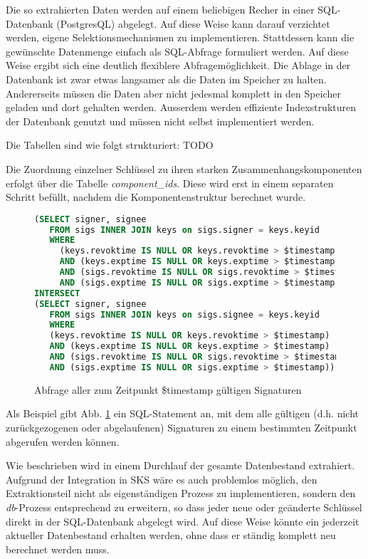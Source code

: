 Die so extrahierten Daten werden auf einem beliebigen Recher in einer
SQL-Datenbank (PostgresQL) abgelegt. Auf diese Weise kann darauf
verzichtet werden, eigene Selektionsmechanismen zu
implementieren. Stattdessen kann die gewünschte Datenmenge einfach als
SQL-Abfrage formuliert werden. Auf diese Weise ergibt sich eine
deutlich flexiblere Abfragemöglichkeit. Die Ablage in der Datenbank
ist zwar etwas langsamer als die Daten im Speicher zu
halten. Andererseits müssen die Daten aber nicht jedesmal komplett in
den Speicher geladen und dort gehalten werden. Ausserdem werden
effiziente Indexstrukturen der Datenbank genutzt und müssen nicht
selbst implementiert werden.

Die Tabellen sind wie folgt strukturiert: TODO

Die Zuordnung einzelner Schlüssel zu ihren starken
Zusammenhangskomponenten erfolgt über die Tabelle
\emph{component\_ids}. Diese wird erst in einem separaten Schritt
befüllt, nachdem die Komponentenstruktur berechnet wurde.

\begin{figure}[h]
\centering
{\scriptsize
\begin{lstlisting}[language=SQL]
(SELECT signer, signee
   FROM sigs INNER JOIN keys on sigs.signer = keys.keyid 
   WHERE 
     (keys.revoktime IS NULL OR keys.revoktime > $timestamp) 
     AND (keys.exptime IS NULL OR keys.exptime > $timestamp)
     AND (sigs.revoktime IS NULL OR sigs.revoktime > $timestamp) 
     AND (sigs.exptime IS NULL OR sigs.exptime > $timestamp)) 
INTERSECT 
(SELECT signer, signee 
   FROM sigs INNER JOIN keys on sigs.signee = keys.keyid
   WHERE 
   (keys.revoktime IS NULL OR keys.revoktime > $timestamp) 
   AND (keys.exptime IS NULL OR keys.exptime > $timestamp) 
   AND (sigs.revoktime IS NULL OR sigs.revoktime > $timestamp) 
   AND (sigs.exptime IS NULL OR sigs.exptime > $timestamp))"
\end{lstlisting}
}
\caption{Abfrage aller zum Zeitpunkt \$timestamp gültigen Signaturen}
  \label{fig:all-valid-keys}
\end{figure}

Als Beispiel gibt Abb. \ref{fig:all-valid-keys} ein SQL-Statement an,
mit dem alle gültigen (d.h. nicht zurückgezogenen oder abgelaufenen)
Signaturen zu einem bestimmten Zeitpunkt abgerufen werden können.

Wie beschrieben wird in einem Durchlauf der gesamte Datenbestand
extrahiert. Aufgrund der Integration in SKS wäre es auch problemlos
möglich, den Extraktionsteil nicht als eigenständigen Prozess zu
implementieren, sondern den \emph{db}-Prozess entsprechend zu
erweitern, so dass jeder neue oder geänderte Schlüssel direkt in der
SQL-Datenbank abgelegt wird. Auf diese Weise könnte ein jederzeit
aktueller Datenbestand erhalten werden, ohne dass er ständig komplett
neu berechnet werden muss.

